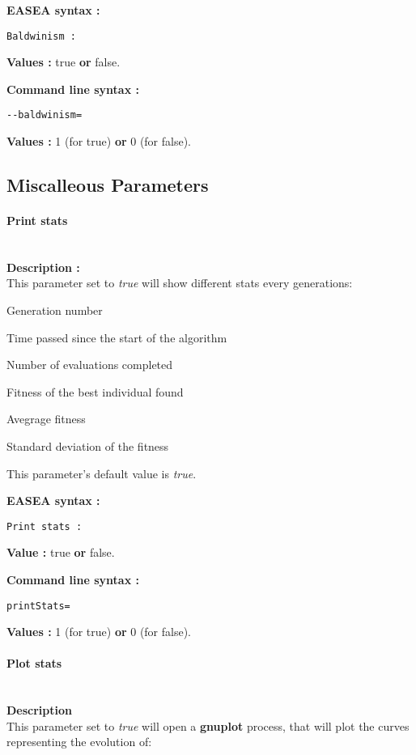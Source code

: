 \documentclass{book}
\begin{document}
\textbf{EASEA syntax :}

\texttt{Baldwinism~:}

\textbf{Values :} true \textbf{or} false.

\textbf{Command line syntax :}

\texttt{-{}-baldwinism=}

\textbf{Values :} 1 (for true) \textbf{or} 0 (for false).

\subsection{Miscalleous Parameters}\label{miscalleous-parameters}

\paragraph{Print stats}\label{print-stats}
~\\

\textbf{Description :}\\This parameter set to \emph{true} will show
different stats every generations:

Generation number

Time passed since the start of the algorithm

Number of evaluations completed

Fitness of the best individual found

Avegrage fitness

Standard deviation of the fitness

This parameter's default value is \emph{true}.

\textbf{EASEA syntax :}

\texttt{Print~stats~:}

\textbf{Value :} true \textbf{or} false.

\textbf{Command line syntax :}

\texttt{printStats=}

\textbf{Values :} 1 (for true) \textbf{or} 0 (for false).

\paragraph{Plot stats}\label{plot-stats}
~\\

\textbf{Description}\\This parameter set to \emph{true} will open a
\textbf{gnuplot} process, that will plot the curves representing the
evolution of:
\end{document}
